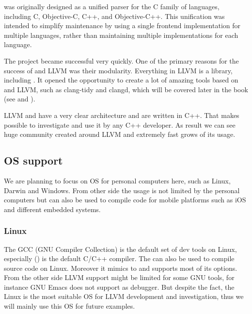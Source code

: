 \clang was originally designed as a unified parser for the C family
of languages, including C, Objective-C, C++, and Objective-C++. This unification
was intended to simplify maintenance by using a single frontend implementation
for multiple languages, rather than maintaining multiple implementations for
each language.

The project became successful very quickly. One of the primary reasons for the
success of \clang and LLVM was their modularity. Everything in LLVM is a library,
including \clang. It opened the opportunity to create a lot of amazing tools
based on \clang and LLVM, such as clang-tidy and clangd, which will be covered
later in the book (see  and ). 

LLVM and \clang have a very clear architecture and are written in C++. That
makes possible to investigate and use it by any C++ developer. As result we can
see huge community created around LLVM and extremely fast grows of its usage.   

\subsection{OS support}
We are planning to focus on OS for personal computers here, such as Linux,
Darwin and Windows. From other side the \clang usage is not limited by
the personal computers but can also be used to compile code for mobile platforms
such as iOS and different embedded systems.

\subsubsection{Linux}
The GCC (GNU Compiler Collection) is the default set of dev tools on Linux,
especially () is the default C/C++ compiler. The
\clang can also be used to compile source code on Linux. Moreover it mimics to
 and supports most of its options. From the other side LLVM
support might be limited for some GNU tools, for instance GNU Emacs does
not support \lldb as debugger. But despite the fact, the Linux is the most
suitable OS for LLVM development and investigation, thus we will mainly use this
OS for future examples. 

